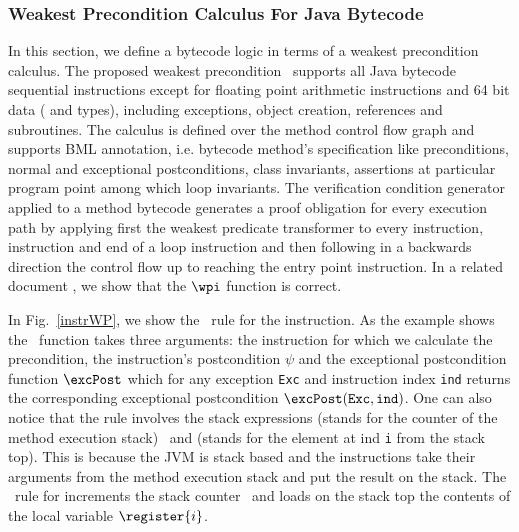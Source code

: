 \subsubsection{Weakest Precondition Calculus For Java
Bytecode}\label{wpbc} In this section, we define a bytecode logic in
terms of a weakest precondition calculus. The proposed weakest
precondition \wpi \ supports all Java bytecode sequential instructions
except for floating point arithmetic instructions and 64 bit data
( and  types), including exceptions, object
creation, references and subroutines. The calculus is defined over the
method control flow graph and supports BML annotation, i.e. bytecode
method's specification like preconditions, normal and exceptional
postconditions, class invariants, assertions at particular program
point among which loop invariants. The verification condition
generator applied to a method bytecode generates a proof obligation
for every execution path by applying first the weakest predicate
transformer to every  instruction, 
instruction and end of a loop instruction and then following in a
backwards direction the control flow up to reaching the entry point
instruction. In a related document \cite{JBL05MP}, we show that the
$\wpi$ function is correct.

 In Fig.~\ref{instrWP}, we show the \wpi \ rule for the  instruction.
 As the example shows the \wpi \ function takes three arguments:
the instruction for which we calculate the precondition, 
the instruction's postcondition $\psi$ and the exceptional postcondition function $\excPost$ which for any exception \texttt{Exc} and 
instruction index \texttt{ind} returns the
corresponding exceptional postcondition $\excPost(\texttt{Exc}, \tt{ind})$. One can also notice that the rule involves the stack expressions \counter 
(stands for the counter of the method execution stack) \ and  (stands for the element at ind \texttt{i} from the stack top).
 This is because the JVM is stack based and the instructions take their arguments from the method execution stack and 
 put the result on the stack.
 The \wpi \ rule for   increments the stack counter \counter \ and loads on the stack top the contents
 of the local variable $\register{i}$. 




